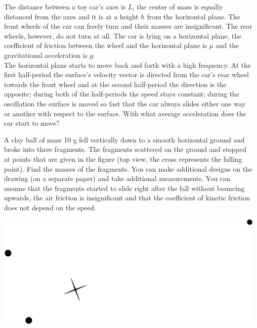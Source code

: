 \documentclass[11pt]{article}
\begin{document}

\probeng
The distance between a toy car’s axes is $L$, the center of mass is equally distanced from the axes and it is at a height $h$ from the horizontal plane. The front wheels of the car can freely turn and their masses are insignificant. The rear wheels, however, do not turn at all. The car is lying on a horizontal plane, the coefficient of friction between the wheel and the horizontal plane is $\mu$ and the gravitational acceleration is $g$.\\
The horizontal plane starts to move back and forth with a high frequency. At the first half-period the surface’s velocity vector is directed from the car’s rear wheel towards the front wheel and at the second half-period the direction is the opposite; during both of the half-periods the speed stays constant; during the oscillation the surface is moved so fast that the car always slides either one way or another with respect to the surface. With what average acceleration does the car start to move?
\probend
\bigskip


\probeng
A clay ball of mass 10 g fell vertically down to a smooth horizontal ground and broke into three fragments. The fragments scattered on the ground and stopped at points that are given in the figure (top view, the cross represents the falling point). Find the masses of the fragments. You can make additional designs on the drawing (on a separate paper) and take additional measurements. You can assume that the fragments started to slide right after the fall without bouncing upwards, the air friction is insignificant and that the coefficient of kinetic friction does not depend on the speed. 
\begin{center}
\includegraphics[width=0.8\linewidth]{2012-lahg-10-killud}
\end{center}
\probend
\bigskip
\end{document}

